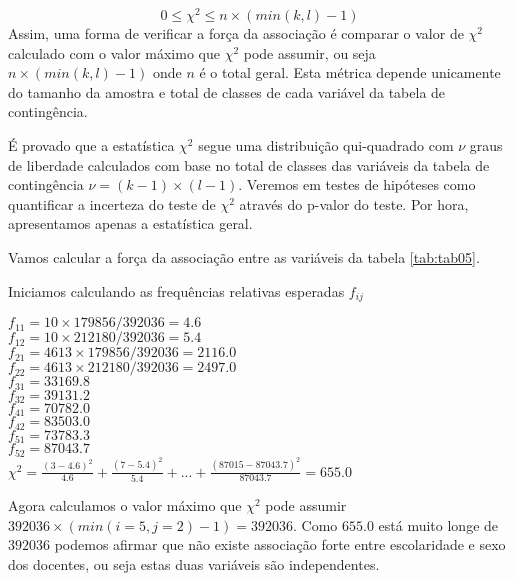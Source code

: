\documentclass[11pt,]{style/krantz}
\renewenvironment{quote}{\begin{VF}}{\end{VF}}
\theoremstyle{definition}
\theoremstyle{definition}
\theoremstyle{definition}
\theoremstyle{remark}
\let\BeginKnitrBlock\begin \let\EndKnitrBlock\end
\begin{document}
\[0 \le \chi^2 \le n\times(min(k,l)-1)\]
Assim, uma forma de verificar a força da associação é comparar o valor de \(\chi^2\) calculado com o valor máximo que \(\chi^2\) pode assumir, ou seja \(n\times(min(k,l)-1)\) onde \(n\) é o total geral. Esta métrica depende unicamente do tamanho da amostra e total de classes de cada variável da tabela de contingência.

\begin{quote}
É provado que a estatística \(\chi^2\) segue uma distribuição qui-quadrado com \(\nu\) graus de liberdade calculados com base no total de classes das variáveis da tabela de contingência \(\nu = (k-1)\times (l-1)\). Veremos em testes de hipóteses como quantificar a incerteza do teste de \(\chi^2\) através do p-valor do teste. Por hora, apresentamos apenas a estatística geral.
\end{quote}

\BeginKnitrBlock{example}
\protect\hypertarget{exm:unnamed-chunk-89}{}{\label{exm:unnamed-chunk-89} }Vamos calcular a força da associação entre as variáveis da tabela \ref{tab:tab05}.
\EndKnitrBlock{example}

\BeginKnitrBlock{solution}
\iffalse{} {Solução. } \fi{}Iniciamos calculando as frequências relativas esperadas \(f_{ij}\)
\EndKnitrBlock{solution}

\(f_{11} = 10 \times 179856 / 392036 = 4.6\)\\
\(f_{12} = 10 \times 212180 / 392036 = 5.4\)\\
\(f_{21} = 4613 \times 179856 / 392036 = 2116.0\)\\
\(f_{22} = 4613 \times 212180 / 392036 = 2497.0\)\\
\(f_{31} = 33169.8\)\\
\(f_{32} = 39131.2\)\\
\(f_{41} = 70782.0\)\\
\(f_{42} = 83503.0\)\\
\(f_{51} = 73783.3\)\\
\(f_{52} = 87043.7\)\\

\(\chi^2 = \frac{(3-4.6)^2}{4.6} + \frac{(7-5.4)^2}{5.4}+...+\frac{(87015-87043.7)^2}{87043.7} = 655.0\)

Agora calculamos o valor máximo que \(\chi^2\) pode assumir \(392036 \times (min(i=5,j=2)-1) = 392036\). Como \(655.0\) está muito longe de \(392036\) podemos afirmar que não existe associação forte entre escolaridade e sexo dos docentes, ou seja estas duas variáveis são independentes.
\end{document}
